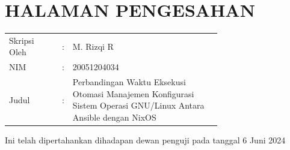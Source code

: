 \documentclass[10pt,twoside]{report}
\begin{document}
%
%
%
%
%
\newpage
\chapter*{HALAMAN PENGESAHAN}
\begin{adjustwidth}{0pt}{}
	\begin{tabular}{@{}lcp{0.7\linewidth}}
		Skripsi Oleh & : & M. Rizqi R                                                 \\
		NIM          & : & 20051204034                                                \\
		Judul        & : & \raggedright Perbandingan Waktu Eksekusi Otomasi Manajemen
		Konfigurasi Sistem Operasi GNU/Linux Antara Ansible dengan NixOS              \\
	\end{tabular}

	\noindent Ini telah dipertahankan dihadapan dewan penguji pada tanggal 6 Juni 2024 \\
\end{adjustwidth}
\end{document}
